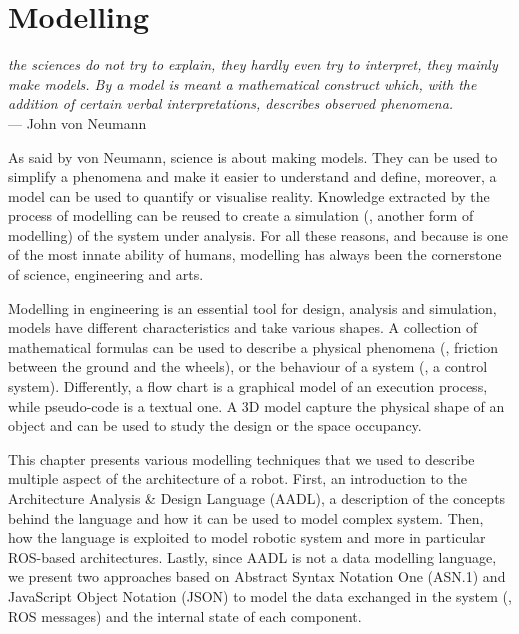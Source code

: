 \chapter[Modelling]{Modelling}\label{ch:Modelling}

\begin{flushright}{\slshape the sciences do not try to explain, they hardly even try to interpret, they mainly make models. By a model is meant a mathematical construct which, with the addition of certain verbal interpretations, describes observed phenomena.} \\ \medskip
    --- John  von Neumann
\end{flushright}

As said by von Neumann, science is about making models. They can be used to simplify a phenomena and make it easier to understand and define, moreover, a model can be used to quantify or visualise reality. Knowledge extracted by the process of modelling can be reused to create a simulation (\ie, another form of modelling) of the system under analysis. For all these reasons, and because is one of the most innate ability of humans, modelling has always been the cornerstone of science, engineering and arts.

Modelling in engineering is an essential tool for design, analysis and simulation, models have different characteristics and take various shapes. A collection of mathematical formulas can be used to describe a physical phenomena (\eg, friction between the ground and the wheels), or the behaviour of a system (\eg, a control system). Differently, a flow chart is a graphical model of an execution process, while pseudo-code is a textual one. A 3D model capture the physical shape of an object and can be used to study the design or the space occupancy.

This chapter presents various modelling techniques that we used to describe multiple aspect of the architecture of a robot. First, an introduction to the  Architecture Analysis \& Design Language (AADL), a description of the concepts behind the language and how it can be used to model complex system. Then, how the language is exploited to model robotic system and more in particular ROS-based architectures.  Lastly, since AADL is not a data modelling language, we present two approaches based on Abstract Syntax Notation One (ASN.1) and JavaScript Object Notation (JSON) to model the data exchanged in the system (\ie, ROS messages) and the internal state of each component.


